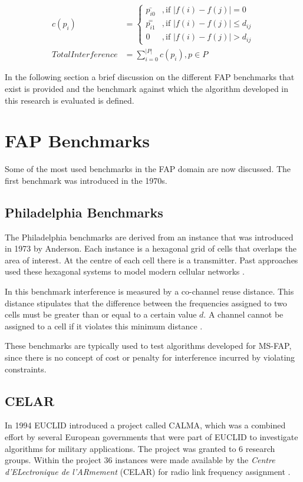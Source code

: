\begin{align} 
 \label{E:interferenceCases}
 c(p_i) &= 
 \begin{cases}
	\bar{p_{i0}} &,\text{if $|f(i) - f(j)| = 0$}\\
	\overset{=}{p_{i1}} &, \text{if $|f(i) - f(j)| \leqslant d_{ij}$}\\
	0 &,\text{if $|f(i) - f(j)| > d_{ij}$}
 \end{cases}\\
 \label{E:costFunction}
 Total Interference &= \sum^{|P|}_{i = 0}c(p_i),p \in P 
\end{align}

In the following section a brief discussion on the different \gls{FAP} benchmarks that exist is provided and the benchmark against which the algorithm developed in this research is evaluated is defined.
\section{FAP Benchmarks}
\label{sec:FAPBenchmarks}
Some of the most used benchmarks in the \gls{FAP} domain are now discussed. The first benchmark was introduced in the 1970s.
\subsection{Philadelphia Benchmarks}
The Philadelphia benchmarks are derived from an instance that was introduced in 1973 by Anderson\cite{AndersonPhiladelphia}. Each instance is a hexagonal grid of cells that overlaps the area of interest. At the centre of each cell there is a transmitter. Past approaches used these hexagonal systems to model modern cellular networks \cite{Karen2004,ExactMIFAP}.

In this benchmark interference is measured by a co-channel reuse distance\cite{Karen2004}. This distance stipulates that the difference between the frequencies  assigned to two cells must be greater than or equal to a certain value $d$. A channel cannot be assigned to a cell if it violates this minimum distance \cite{ExactMIFAP}.

These benchmarks are typically used to test algorithms developed for \gls{MS-FAP}, since there is no concept of cost or penalty for interference incurred by violating constraints.
\subsection{CELAR}
In 1994 \gls{EUCLID} introduced a project called CALMA, which was a combined effort by several European governments that were part of \gls{EUCLID} to investigate algorithms for military applications\cite{Karen2004}. The project was granted to 6 research groups. Within the project 36 instances were made available by the \emph{Centre d'ELectronique de l'ARmement} (CELAR) for radio link frequency assignment \cite{Karen2004,DynamicFAP}.


